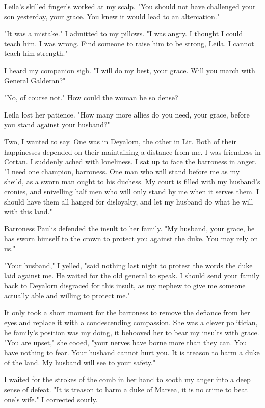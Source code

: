 \documentclass{article}
\begin{document}
Leila's skilled finger's worked at my scalp. "You should not have challenged your son yesterday, your grace. You knew it would lead to an altercation."

"It was a mistake." I admitted to my pillows. "I was angry. I thought I could teach him. I was wrong. Find someone to raise him to be strong, Leila. I cannot teach him strength."

I heard my companion sigh. "I will do my best, your grace. Will you march with General Galderan?"

"No, of course not." How could the woman be so dense?

Leila lost her patience. "How many more allies do you need, your grace, before you stand against your husband?"

Two, I wanted to say. One was in Deyalorn, the other in Lir. Both of their happinesses depended on their maintaining a distance from me. I was friendless in Cortan. I suddenly ached with loneliness. I sat up to face the barroness in anger. "I need one champion, barroness. One man who will stand before me as my sheild, as a sworn man ought to his duchess. My court is filled with my husband's cronies, and snivelling half men who will only stand by me when it serves them. I should have them all hanged for disloyalty, and let my husband do what he will with this land."

Barroness Paulis defended the insult to her family. "My husband, your grace, he has sworn himself to the crown to protect you against the duke. You may rely on us."

"Your husband," I yelled, "said nothing last night to protest the words the duke laid against me. He waited for the old general to speak. I should send your family back to Deyalorn disgraced for this insult, as my nephew to give me someone actually able and willing to protect me."

It only took a short moment for the barroness to remove the defiance from her eyes and replace it with a condescending compassion. She was a clever politician, he family's position was my doing, it behooved her to bear my insults with grace. "You are upset," she cooed, "your nerves have borne more than they can. You have nothing to fear. Your husband cannot hurt you. It is treason to harm a duke of the land. My husband will see to your safety."

I waited for the strokes of the comb in her hand to sooth my anger into a deep sense of defeat. "It is treason to harm a duke of Marsea, it is no crime to beat one's wife." I corrected sourly.
\end{document}
